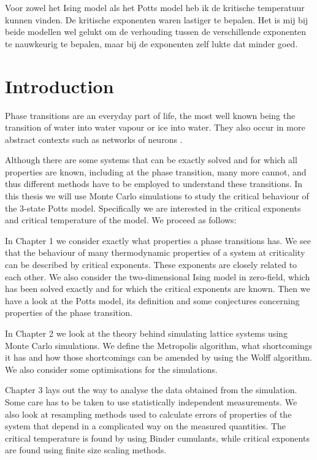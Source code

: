 \documentclass[11pt, a4paper]{report} %
\begin{document}
Voor zowel het Ising model als het Potts model heb ik de kritische temperatuur kunnen vinden.
De kritische exponenten waren lastiger te bepalen.
Het is mij bij beide modellen wel gelukt om de verhouding tussen de verschillende exponenten te nauwkeurig te bepalen, maar bij de exponenten zelf lukte dat minder goed.



\tableofcontents

\chapter*{Introduction}
Phase transitions are an everyday part of life, the most well known being the transition of water into water vapour or ice into water.
They also occur in more abstract contexts such as networks of neurons \cite{tkacik:2015}.

Although there are some systems that can be exactly solved and for which all properties are known, including at the phase transition, many more cannot, and thus different methods have to be employed to understand these transitions.
In this thesis we will use Monte Carlo simulations to study the critical behaviour of the 3-state Potts model.
Specifically we are interested in the critical exponents and critical temperature of the model.
We proceed as follows:

In Chapter 1 we consider exactly what properties a phase transitions has.
We see that the behaviour of many thermodynamic properties of a system at criticality can be described by critical exponents.
These exponents are closely related to each other.
We also consider the two-dimensional Ising model in zero-field, which has been solved exactly and for which the critical exponents are known.
Then we have a look at the Potts model, its definition and some conjectures concerning properties of the phase transition.

In Chapter 2 we look at the theory behind simulating lattice systems using Monte Carlo simulations.
We define the Metropolis algorithm, what shortcomings it has and how those shortcomings can be amended by using the Wolff algorithm.
We also consider some optimisations for the simulations.

Chapter 3 lays out the way to analyse the data obtained from the simulation.
Some care has to be taken to use statistically independent measurements.
We also look at resampling methods used to calculate errors of properties of the system that depend in a complicated way on the measured quantities.
The critical temperature is found by using Binder cumulants, while critical exponents are found using finite size scaling methods.
\end{document}
